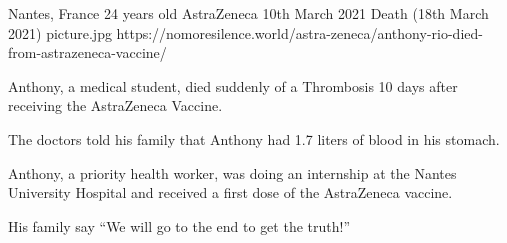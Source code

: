 {Nantes, France}
{24 years old}
{AstraZeneca}
{10th March 2021}
{Death (18th March 2021)}
{picture.jpg}
{https://nomoresilence.world/astra-zeneca/anthony-rio-died-from-astrazeneca-vaccine/}
{

Anthony, a medical student, died suddenly of a Thrombosis 10 days after
receiving the AstraZeneca Vaccine.

The doctors told his family that Anthony had 1.7 liters of blood in his stomach.

Anthony, a priority health worker, was doing an internship at the Nantes
University Hospital and received a first dose of the AstraZeneca vaccine.

His family say “We will go to the end to get the truth!”

}
